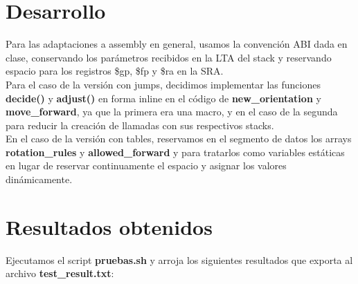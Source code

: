 \documentclass[a4paper, 10pt, twoside, notitlepage]{article}
\begin{document}
\newpage
\section{Desarrollo}
\normalsize
Para las adaptaciones a assembly en general, usamos la convención ABI dada en clase, conservando los parámetros recibidos en la LTA del stack y reservando espacio para los registros \$gp, \$fp y \$ra en la SRA.\\
Para el caso de la versión con jumps, decidimos implementar las funciones \textbf{decide()} y \textbf{adjust()} en forma inline en el código de \textbf{new\_orientation} y \textbf{move\_forward}, ya que la primera era una macro, y en el caso de la segunda para reducir la creación de llamadas con sus respectivos stacks.\\
En el caso de la versión con tables, reservamos en el segmento de datos los arrays \textbf{rotation\_rules} y \textbf{allowed\_forward} y para tratarlos como variables estáticas en lugar de reservar continuamente el espacio y asignar los valores dinámicamente.\\



\newpage
\section{Resultados obtenidos}
Ejecutamos el script \textbf{pruebas.sh} y arroja los siguientes resultados que exporta al archivo \textbf{test\_result.txt}:
\end{document}
